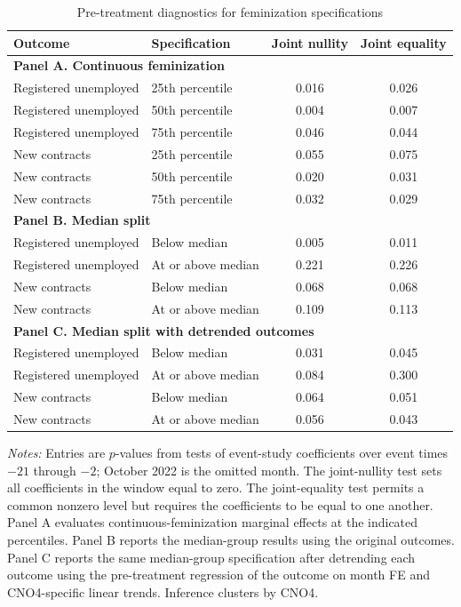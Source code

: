 \begin{table}[!htbp]
\centering
\caption{Pre-treatment diagnostics for feminization specifications}
\label{tab:v1_feminization_pretrends}
\begin{threeparttable}
\small
\begin{tabular}{llcc}
\toprule
Outcome & Specification & Joint nullity & Joint equality \\
\midrule
\multicolumn{4}{l}{\textbf{Panel A. Continuous feminization}} \\
Registered unemployed & 25th percentile & 0.016 & 0.026 \\
Registered unemployed & 50th percentile & 0.004 & 0.007 \\
Registered unemployed & 75th percentile & 0.046 & 0.044 \\
New contracts & 25th percentile & 0.055 & 0.075 \\
New contracts & 50th percentile & 0.020 & 0.031 \\
New contracts & 75th percentile & 0.032 & 0.029 \\
\midrule
\multicolumn{4}{l}{\textbf{Panel B. Median split}} \\
Registered unemployed & Below median & 0.005 & 0.011 \\
Registered unemployed & At or above median & 0.221 & 0.226 \\
New contracts & Below median & 0.068 & 0.068 \\
New contracts & At or above median & 0.109 & 0.113 \\
\midrule
\multicolumn{4}{l}{\textbf{Panel C. Median split with detrended outcomes}} \\
Registered unemployed & Below median & 0.031 & 0.045 \\
Registered unemployed & At or above median & 0.084 & 0.300 \\
New contracts & Below median & 0.064 & 0.051 \\
New contracts & At or above median & 0.056 & 0.043 \\
\bottomrule
\end{tabular}
\begin{tablenotes}[flushleft]
\footnotesize
\item \emph{Notes:} Entries are $p$-values from tests of event-study coefficients over event times $-21$ through $-2$; October 2022 is the omitted month. The joint-nullity test sets all coefficients in the window equal to zero. The joint-equality test permits a common nonzero level but requires the coefficients to be equal to one another. Panel A evaluates continuous-feminization marginal effects at the indicated percentiles. Panel B reports the median-group results using the original outcomes. Panel C reports the same median-group specification after detrending each outcome using the pre-treatment regression of the outcome on month FE and CNO4-specific linear trends. Inference clusters by CNO4.
\end{tablenotes}
\end{threeparttable}
\end{table}
